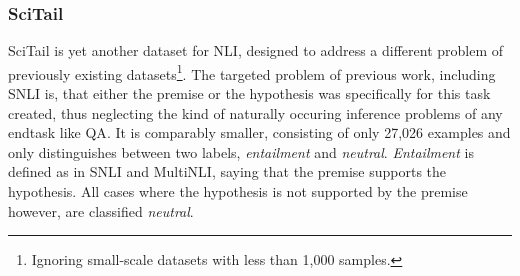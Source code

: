 \subsubsection{SciTail}
SciTail \citep{scitail} is yet another dataset for \ac{NLI}, designed to address a different problem of previously existing datasets\footnote{Ignoring small-scale datasets with less than 1,000 samples.}. The targeted problem of previous work, including \ac{SNLI} is, that either the premise or the hypothesis was specifically for this task created, thus neglecting the kind of naturally occuring inference problems of any endtask like \ac{QA}. It is comparably smaller, consisting of only 27,026 examples and only distinguishes between two labels, \textit{entailment} and \textit{neutral}. \textit{Entailment} is defined as in \ac{SNLI} and \ac{MultiNLI}, saying that the premise supports the hypothesis. All cases where the hypothesis is not supported by the premise however, are classified \textit{neutral}.

